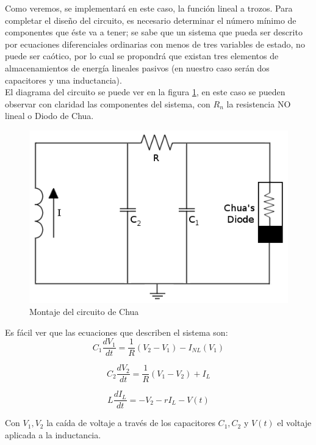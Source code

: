 \documentclass[%
 reprint,
 amsmath,amssymb,
 aps,
]{revtex4-1}
\begin{document}
Como veremos, se implementará en este caso, la función lineal a trozos. Para completar el diseño del circuito, es necesario determinar el número mínimo de componentes que éste va a tener; se sabe que un sistema que pueda ser descrito por ecuaciones diferenciales ordinarias con menos de tres variables de estado, no puede ser caótico, \cite{chua} por lo cual se propondrá que existan tres elementos de almacenamientos de energía lineales pasivos (en nuestro caso serán dos capacitores y una inductancia). \\

El diagrama del circuito se puede ver en la figura \ref{fig:chua}\cite{isaza}, en este caso se pueden observar con claridad las componentes del sistema, con $R_n$ la resistencia NO lineal o Diodo de Chua. \\

\begin{figure}
\centering
\includegraphics[width=0.7\linewidth]{"chua"}
\caption{Montaje del circuito de Chua}
\label{fig:chua}
\end{figure}

Es fácil ver que las ecuaciones que describen el sistema son:\\

\begin{equation}
	C_1 \frac{dV_1}{dt}=\frac{1}{R}(V_2-V_1)-I_{NL} (V_1)
\label{eq:1}
\end{equation}

\begin{equation}
	C_2\frac{dV_2}{dt}=\frac{1}{R}(V_1-V_2)+I_L
\label{eq:2}
\end{equation}

\begin{equation}
	L\frac{dI_L}{dt}=-V_2-rI_L-V(t)
\label{eq:3}
\end{equation}

Con $V_1, V_2$ la caída de voltaje a través de los capacitores $C_1,C_2$ y $V(t)$ el voltaje aplicada a la inductancia. \\ 
\end{document}
